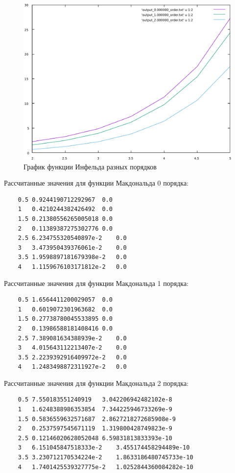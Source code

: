 \documentclass[a4paper,14pt]{extarticle}
\begin{document}
\begin{figure}[H]
\includegraphics[height=\textwidth, width=\textwidth]{include/inf_1.pdf}
\caption{График функции Инфельда разных порядков}
\end{figure}

\newpage

Рассчитанные значения для функции Макдональда 0 порядка:
\begin{verbatim}
	0.5	0.9244190712292967	0.0
	1	0.4210244382426492	0.0
	1.5	0.21380556265005018	0.0
	2	0.11389387275302776	0.0
	2.5	6.234755320540897e-2	0.0
	3	3.473950439376061e-2	0.0
	3.5	1.9598897181679398e-2	0.0
	4	1.1159676103171812e-2	0.0
\end{verbatim}

Рассчитанные значения для функции Макдональда 1 порядка:
\begin{verbatim}
	0.5	1.6564411200029057	0.0
	1	0.6019072301963682	0.0
	1.5	0.27738780045533895	0.0
	2	0.13986588181408416	0.0
	2.5	7.389081634388939e-2	0.0
	3	4.015643112213407e-2	0.0
	3.5	2.2239392916409972e-2	0.0
	4	1.2483498872311927e-2	0.0
\end{verbatim}

Рассчитанные значения для функции Макдональда 2 порядка:
\begin{verbatim}
	0.5	7.550183551240919	3.042206942482102e-8
	1	1.6248388986353854	7.344225946733269e-9
	1.5	0.5836559632571687	2.8627218272685908e-9
	2	0.2537597545671119	1.319800428749823e-9
	2.5	0.12146020628052048	6.59831813833393e-10
	3	6.151045847518333e-2	3.455174458294489e-10
	3.5	3.230712170534224e-2	1.8633186480745733e-10
	4	1.7401425539327775e-2	1.0252844360084282e-10
\end{verbatim}
\end{document}

